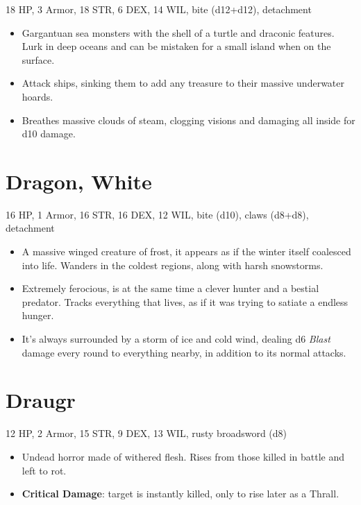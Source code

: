 \documentclass[
  10pt,
  american,
]{article}
\begin{document}
18 HP, 3 Armor, 18 STR, 6 DEX, 14 WIL, bite (d12+d12), detachment

\begin{samepage}
\begin{itemize}
\setlength\itemsep{-.5em}
\item Gargantuan sea monsters with the shell of a turtle and draconic features. Lurk in deep oceans and can be mistaken for a small island when on the surface.
\item Attack ships, sinking them to add any treasure to their massive underwater hoards.
\item Breathes massive clouds of steam, clogging visions and damaging all inside for d10 damage.
\end{itemize}
\end{samepage}

\hypertarget{dragon-white}{%
\section{Dragon, White}\label{dragon-white}}

16 HP, 1 Armor, 16 STR, 16 DEX, 12 WIL, bite (d10), claws (d8+d8),
detachment

\begin{samepage}
\begin{itemize}
\setlength\itemsep{-.5em}
\item A massive winged creature of frost, it appears as if the winter itself coalesced into life. Wanders in the coldest regions, along with harsh snowstorms.
\item Extremely ferocious, is at the same time a clever hunter and a bestial predator. Tracks everything that lives, as if it was trying to satiate a endless hunger.
\item It's always surrounded by a storm of ice and cold wind, dealing d6 \emph{Blast} damage every round to everything nearby, in addition to its normal attacks.
\end{itemize}
\end{samepage}

\hypertarget{draugr}{%
\section{Draugr}\label{draugr}}

12 HP, 2 Armor, 15 STR, 9 DEX, 13 WIL, rusty broadsword (d8)

\begin{samepage}
\begin{itemize}
\setlength\itemsep{-.5em}
\item Undead horror made of withered flesh. Rises from those killed in battle and left to rot.
\item \textbf{Critical Damage}: target is instantly  killed, only to rise later as a Thrall.
\end{itemize}
\end{samepage}
\end{document}
